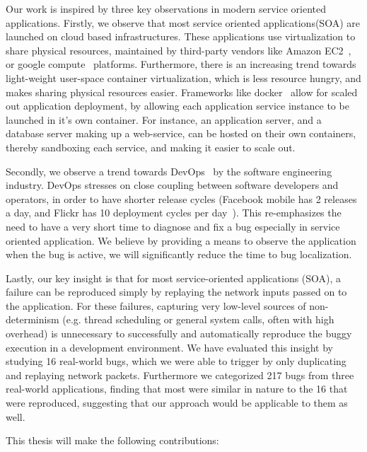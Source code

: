 Our work is inspired by three key observations in modern service oriented applications.
Firstly, we observe that most service oriented applications(SOA) are launched on cloud based infrastructures.
These applications use virtualization to share physical resources, maintained by third-party vendors like Amazon EC2~\cite{ec2}, or google compute~\cite{gcompute} platforms.
Furthermore, there is an increasing trend towards light-weight user-space container virtualization, which is less resource hungry, and makes sharing physical resources easier.
Frameworks like docker~\cite{docker} allow for scaled out application deployment, by allowing each application service instance to be launched in it's own container.
For instance, an application server, and a database server making up a web-service, can be hosted on their own containers, thereby sandboxing each service, and making it easier to scale out.

Secondly, we observe a trend towards DevOps~\cite{devops} by the software engineering industry.
DevOps stresses on close coupling between software developers and operators, in order to have shorter release cycles (Facebook mobile has 2 releases a day, and Flickr has 10 deployment cycles per day~\cite{10DevOps}).
This re-emphasizes the need to have a very short time to diagnose and fix a bug especially in service oriented application.
We believe by providing a means to observe the application when the bug is active, we will significantly reduce the time to bug localization.

Lastly, our key insight is that for most service-oriented applications (SOA), a failure can be reproduced simply by replaying the network inputs passed on to the application.
For these failures, capturing very low-level sources of non-determinism (e.g. thread scheduling or general system calls, often with high overhead) is unnecessary to successfully and automatically reproduce the buggy execution in a development environment. 
We have evaluated this insight by studying 16 real-world bugs, which we were able to trigger by only duplicating and replaying network packets.
Furthermore we categorized 217 bugs from three real-world applications, finding that most were similar in nature to the 16 that were reproduced, suggesting that our approach would be applicable to them as well.

\noindent This thesis will make the following contributions:

